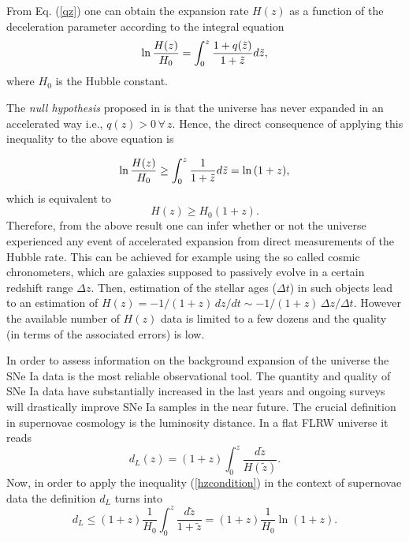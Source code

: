 \documentclass[nofootinbib,twocolumn]{revtex4}
\begin{document}
From Eq. (\ref{qz}) one can obtain the expansion rate $H(z)$ as a function of the deceleration parameter according to the integral equation
\begin{equation}
{\rm ln}\,\frac{H(z)}{H_0}=\int^z_0 \frac{1+q(\tilde{z})}{1+\tilde{z}} d\tilde{z},
\end{equation}
where $H_0$ is the Hubble constant.

The {\it null hypothesis} proposed in \cite{Seikel:2007pk} is that the universe has never expanded in an accelerated way i.e., $q(z)>0 \,\forall \,z$. Hence, the direct consequence of applying this inequality to the above equation is

\begin{equation}
{\rm ln}\,\frac{H(z)}{H_0}\geq\int^z_0\frac{1}{1+\tilde{z}}d\tilde{z}={\rm ln}\,(1+z),
\end{equation}
which is equivalent to 
\begin{equation}\label{hzcondition}
H(z)\geq H_0 (1+z).
\end{equation}
Therefore, from the above result one can infer whether or not the universe experienced any event of accelerated expansion from direct measurements of the Hubble rate. This can be achieved for example using the so called cosmic chronometers, which are galaxies supposed to passively evolve in a certain redshift range $\Delta z$. Then, estimation of the stellar ages ($\Delta t$) in such objects lead to an estimation of $H(z)= -1/(1+z) \, dz/dt \sim -1/(1+z) \, \Delta z / \Delta t$. However the available number of $H(z)$ data is limited to a few dozens and the quality (in terms of the associated errors) is low.

In order to assess information on the background expansion of the universe  the SNe Ia data is the most reliable observational tool. The quantity and quality of SNe Ia data have substantially increased in the last years and ongoing surveys will drastically improve SNe Ia samples in the near future. The crucial definition in supernovae cosmology is the luminosity distance. In a flat FLRW universe it reads
\begin{equation}
d_L(z)= (1+z) \int^{z}_0 \frac{d\tilde{z}}{H(\tilde{z})}.
\end{equation}
Now, in order to apply the inequality (\ref{hzcondition}) in the context of supernovae data the definition $d_L$ turns into 
\begin{equation}
d_L\leq (1+z) \frac{1}{H_0} \int^z_0 \frac{d\tilde{z}}{1+\tilde{z}}=(1+z)\frac{1}{H_0} \ln (1+z). 
\end{equation}
\end{document}
